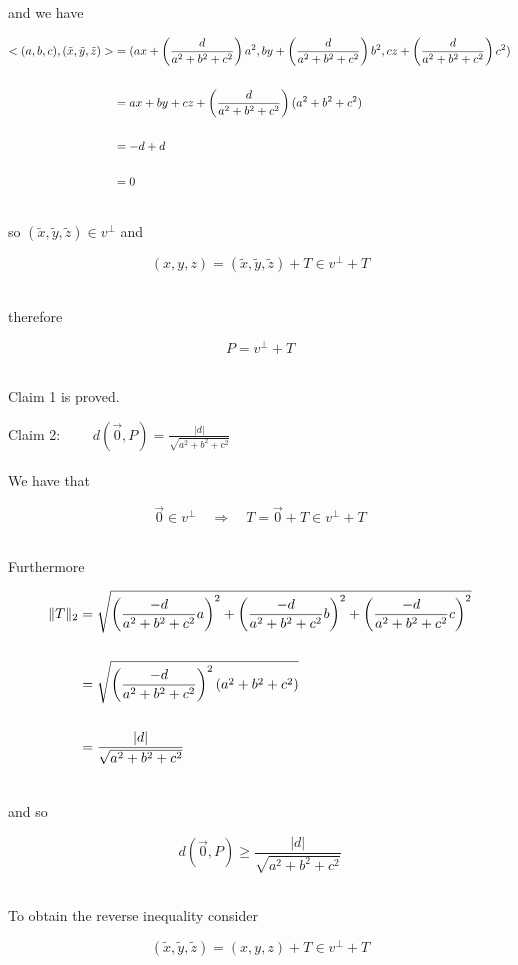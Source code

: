 \documentclass[12pt,letterpaper]{hmcpset}
\begin{document}
\begin{solution}
and we have

\begin{align}
<(a,b,c), (\tilde{x},\tilde{y},\tilde{z})> &= (ax+ \left(\frac{d}{a^2+b^2+c^2}\right) a^2, by+ \left(\frac{d}{a^2+b^2+c^2} \right) b^2, cz + \left(\frac{d}{a^2+b^2+c^2}\right) c^2)\notag\\
&\quad\notag\\
&= ax+by + cz +  \left(\frac{d}{a^2+b^2+c^2}\right)(a^2+b^2+c^2)\notag\\
&\quad\notag\\
&= -d +d \notag\\
&\quad\notag\\
&= 0 \notag\\
\notag
\end{align}

so $(\tilde{x},\tilde{y},\tilde{z}) \in v^{\bot}$ and 
 
\[  (x,y,z) = (\tilde{x},\tilde{y},\tilde{z}) + T \in v^{\bot}+T \]\

therefore

\[ P = v^{\bot}+T \]\

Claim 1 is proved.

\newpage

{\large Claim 2: $\quad\quad d(\vec0, P) =  \frac{\vert d\vert}{\sqrt{a^2+b^2+c^2}}$}\\
\\

We have that 

\[ \vec0 \in v^{\bot} \quad \Rightarrow \quad T = \vec0 + T \in v^{\bot} + T\]\

  Furthermore

\begin{align}
\Vert T \Vert_2 &= \sqrt{\left(\frac{-d}{a^2+b^2+c^2} a\right)^2+\left(\frac{-d}{a^2+b^2+c^2} b\right)^2+\left( \frac{-d}{a^2+b^2+c^2} c\right)^2}\notag\\
\quad\notag\\
&= \sqrt{ \left(\frac{-d}{a^2+b^2+c^2}\right)^2(a^2+b^2+c^2) }\notag\\
\quad\notag\\
&= \frac{\vert d\vert}{\sqrt{a^2+b^2+c^2}}\notag\\
\notag
\end{align}

and so 

\[ d(\vec0,P) \geq \frac{\vert d\vert}{\sqrt{a^2+b^2+c^2}}\]\


To obtain the reverse inequality consider 

\[ (\tilde{x},\tilde{y},\tilde{z}) =(x,y,z)  + T \in v^{\bot} + T\]\


\end{solution}
\end{document}

